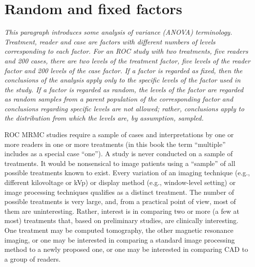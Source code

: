 \documentclass[
]{book}
\begin{document}
\hypertarget{random-and-fixed-factors}{%
\section{Random and fixed factors}\label{random-and-fixed-factors}}

\emph{This paragraph introduces some analysis of variance (ANOVA) terminology. Treatment, reader and case are factors with different numbers of levels corresponding to each factor. For an ROC study with two treatments, five readers and 200 cases, there are two levels of the treatment factor, five levels of the reader factor and 200 levels of the case factor. If a factor is regarded as fixed, then the conclusions of the analysis apply only to the specific levels of the factor used in the study. If a factor is regarded as random, the levels of the factor are regarded as random samples from a parent population of the corresponding factor and conclusions regarding specific levels are not allowed; rather, conclusions apply to the distribution from which the levels are, by assumption, sampled.}

ROC MRMC studies require a sample of cases and interpretations by one or more readers in one or more treatments (in this book the term ``multiple'' includes as a special case ``one''). A study is never conducted on a sample of treatments. It would be nonsensical to image patients using a ``sample'' of all possible treatments known to exist. Every variation of an imaging technique (e.g., different kilovoltage or kVp) or display method (e.g., window-level setting) or image processing techniques qualifies as a distinct treatment. The number of possible treatments is very large, and, from a practical point of view, most of them are uninteresting. Rather, interest is in comparing two or more (a few at most) treatments that, based on preliminary studies, are clinically interesting. One treatment may be computed tomography, the other magnetic resonance imaging, or one may be interested in comparing a standard image processing method to a newly proposed one, or one may be interested in comparing CAD to a group of readers.
\end{document}
